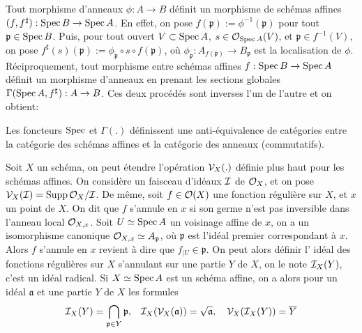 Tout morphisme d'anneaux $\phi:A\rightarrow B$ définit un morphisme de schémas affines $(f,f^\sharp):\operatorname{Spec} B\rightarrow\operatorname{Spec} A$. En effet, on pose $f(\mathfrak{p}):=\phi^{-1}(\mathfrak{p})$ pour tout $\mathfrak{p}\in \operatorname{Spec} B$. Puis, pour tout ouvert $V\subset \operatorname{Spec} A$, $s\in\mathcal{O}_{\operatorname{Spec} A}(V)$, et $\mathfrak{p}\in f^{-1}(V)$, on pose $f^\sharp(s)(\mathfrak{p}):=\phi_{\mathfrak{p}}\circ s \circ f(\mathfrak{p})$, où $\phi_{\mathfrak{p}}:A_{f(\mathfrak{p})}\rightarrow B_{\mathfrak{p}}$ est la localisation de $\phi$.
Réciproquement, tout morphisme entre schémas affines $f:\operatorname{Spec} B\rightarrow \operatorname{Spec} A$ définit un morphisme d'anneaux en prenant les sections globales $\Gamma(\operatorname{Spec} A, f^\sharp):A\rightarrow B$. Ces deux procédés sont inverses l'un de l'autre et on obtient:


\begin{prop}\label{EqCat}
Les foncteurs $\operatorname{Spec}$ et $\Gamma(.)$ définissent une anti-équivalence de catégories entre la catégorie des schémas affines et la catégorie des anneaux (commutatifs).
\end{prop}

Soit $X$ un schéma, on peut étendre l'opération $\mathcal{V}_X(.)$ définie plus haut pour les schémas affines. On considère un faisceau d'idéaux $\mathcal{I}$ de $\mathcal{O}_X$, et on pose $\mathcal{V}_X(\mathcal{I})=\operatorname{Supp} \mathcal{O}_X/\mathcal{I}$. De même, soit $f\in \mathcal{O}(X)$ une fonction régulière sur $X$, et $x$ un point de $X$. On dit que $f$ s'annule en $x$ si son germe n'est pas inversible dans l'anneau local $\mathcal{O}_{X,x}$. Soit $U\simeq\operatorname{Spec} A$ un voisinage affine de $x$, on a un isomorphisme canonique $\mathcal{O}_{X,x}\simeq A_\mathfrak{p}$, où $\mathfrak{p}$ est l'idéal premier correspondant à $x$. Alors $f$ s'annule en $x$ revient à dire que $f_{|U}\in \mathfrak{p}$. On peut alors définir l' idéal des fonctions régulières sur $X$ s'annulant sur une partie $Y$ de $X$, on le note $\mathcal{I}_X(Y)$, c'est un idéal radical. Si $X\simeq\operatorname{Spec} A$ est un schéma affine, on a alors pour un idéal $\mathfrak{a}$ et une partie $Y$ de $X$ les formules
$$\mathcal{I}_X(Y)=\bigcap_{\mathfrak{p}\in Y}\mathfrak{p},\,\,\,\,\, \mathcal{I}_X(\mathcal{V}_X(\mathfrak{a}))=\sqrt{\mathfrak{a}},\,\,\,\,\,\,\mathcal{V}_X(\mathcal{I}_X(Y))=\overline{Y}$$

